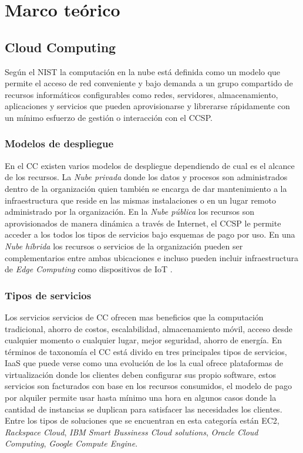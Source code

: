 \section{Marco teórico}
\subsection{Cloud Computing}
Según el \acrshort{NIST} la computación en la nube está definida como un modelo que permite el acceso de red conveniente y bajo demanda a un grupo compartido de recursos informáticos configurables como redes, servidores, almacenamiento, aplicaciones y servicios que pueden aprovisionarse y librerarse rápidamente con un mínimo esfuerzo de gestión o interacción con el \acrshort{CCSP}\cite{liu2011nist}.
\bigskip

\subsubsection{Modelos de despliegue}
En el \acrshort{CC} existen varios modelos de despliegue dependiendo de cual es el alcance de los recursos. La \emph{Nube privada} donde los datos y procesos son administrados dentro de la organización quien también se encarga de dar mantenimiento a la infraestructura que reside en las mismas instalaciones o en un lugar remoto administrado por la organización. En la \emph{Nube pública} los recursos son aprovisionados de manera dinámica a través de Internet, el \acrshort{CCSP} le permite acceder a los todos los tipos de servicios bajo esquemas de pago por uso. En una \emph{Nube híbrida} los recursos o servicios de la organización pueden ser complementarios entre ambas ubicaciones e incluso pueden incluir infraestructura de \emph{Edge Computing} como dispositivos de \acrshort{IoT} \cite[p.2]{choudhary2007software}.

\subsubsection{Tipos de servicios}
Los servicios servicios de \acrshort{CC} ofrecen mas beneficios que la computación tradicional, ahorro de costos, escalabilidad, almacenamiento móvil, acceso desde cualquier momento o cualquier lugar, mejor seguridad, ahorro de energía\cite{sether2016cloud}. En términos de taxonomía el \acrshort{CC} está divido en tres principales tipos de servicios, \acrfull{IaaS} que puede verse como una evolución de los  la cual ofrece plataformas de virtualización donde los clientes deben configurar sus propio software, estos servicios son facturados con base en los recursos consumidos, el modelo de pago por alquiler permite usar hasta mínimo una hora en algunos casos donde la cantidad de instancias se duplican para satisfacer las necesidades los clientes. Entre los tipos de soluciones que se encuentran en esta categoría están \acrfull{EC2}, \emph{Rackspace Cloud}, \emph{IBM Smart Bussiness Cloud solutions}, \emph{Oracle Cloud Computing}, \emph{Google Compute Engine}. \cite[p.2]{sether2016cloud}\bigskip

